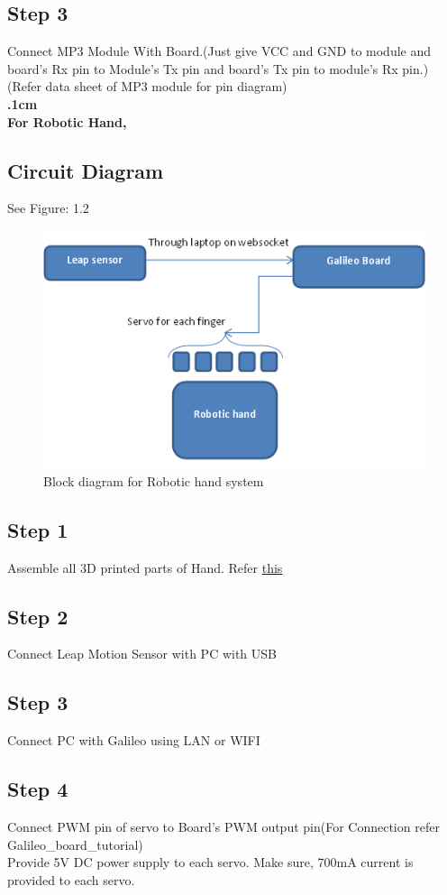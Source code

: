 \documentclass[a4paper,12pt,oneside]{book}
\begin{document}
\subsection*{Step 3}
Connect MP3 Module With Board.(Just give VCC and GND to module and board's Rx pin to Module's Tx pin and board's Tx pin to module's Rx pin.)(Refer data sheet of MP3 module for pin diagram)\\
\textbf{.1cm}\\
\textbf{For Robotic Hand,}
\subsection*{Circuit Diagram}
See Figure: 1.2
\begin{figure}
  \includegraphics[width=\linewidth]{2.png}
  \caption{Block diagram for Robotic hand system}
\end{figure}
\subsection*{Step 1}
Assemble all 3D printed parts of Hand. Refer \href{http://inmoov.fr/hand-and-forarm/}{this}
\subsection*{Step 2}
Connect Leap Motion Sensor with PC with USB
\subsection*{Step 3}
Connect PC with Galileo using LAN or WIFI
\subsection*{Step 4}
Connect PWM pin of servo to Board's PWM output pin(For Connection refer Galileo\_board\_tutorial)\\
Provide 5V DC power supply to each servo. Make sure, 700mA current is provided to each servo.
\end{document}
